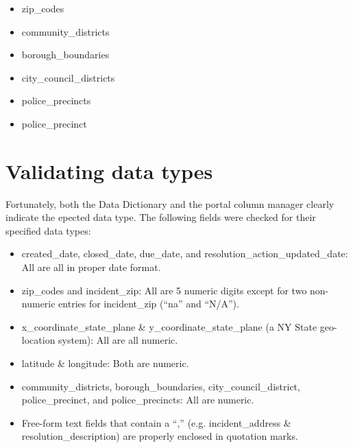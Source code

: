 \documentclass[12pt, titlepage]{article}
\begin{document}
\begin{itemize}
	\item zip\_codes
	\item community\_districts
	\item borough\_boundaries
	\item city\_council\_districts
	\item police\_precincts
	\item police\_precinct 
\end{itemize}	

	
		
\section{Validating data types}
\label{sec:datatypes}
Fortunately, both the Data Dictionary and the portal column manager 
clearly indicate the epected data type. The following fields were 
checked for their specified data types:

	
\begin{itemize}
	\item created\_date, closed\_date, due\_date, and resolution\_action\_updated\_date: 
	All are all in proper date format.
	
	\item zip\_codes and incident\_zip: All are 5 numeric digits except 
	for two non-numeric entries for incident\_zip (``na'' and ``N/A'').
	
	\item x\_coordinate\_state\_plane \&  y\_coordinate\_state\_plane 
	(a NY State geo-location system): All are all numeric.
	
	\item latitude \& longitude: Both are numeric.
	
	\item community\_districts, borough\_boundaries, 
	city\_council\_district, police\_precinct, and police\_precincts: All are numeric.
	
	\item Free-form text fields that contain a ``,'' (e.g. incident\_address 
	\& resolution\_description) are properly enclosed in quotation marks.
\end{itemize}	

 
\end{document}
